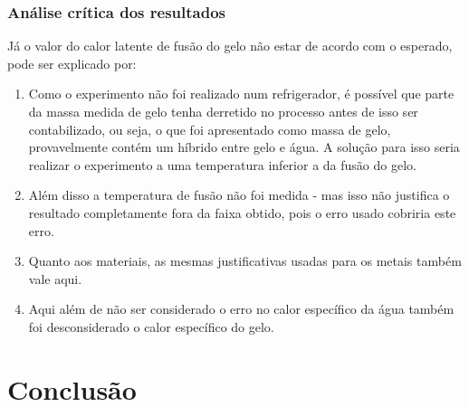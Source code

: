 \documentclass[a4paper]{article}
\begin{document}
			\subsubsection{Análise crítica dos resultados}
				Já o valor do calor latente de fusão do gelo não estar de acordo com o esperado,
				pode ser explicado por:
					\begin{enumerate}
						\item Como o experimento não foi realizado num refrigerador, é possível
						que parte da massa medida de gelo tenha derretido no processo antes
						de isso ser contabilizado, ou seja, o que foi apresentado como massa
						de gelo, provavelmente contém um híbrido entre gelo e água. A solução
						para isso seria realizar o experimento a uma temperatura inferior
						a da fusão do gelo.
						\item Além disso a temperatura de fusão não foi medida - mas isso não justifica
						o resultado completamente fora da faixa obtido, pois o erro usado cobriria este
						erro.
						\item Quanto aos materiais, as mesmas justificativas usadas para os metais
						também vale aqui.
						\item Aqui além de não ser considerado o erro no calor específico da água
						também foi desconsiderado o calor específico do gelo.
					\end{enumerate}



	\section{Conclusão}
\end{document}
